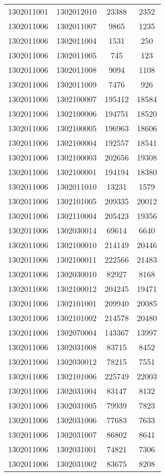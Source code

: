 \begin{longtable}[h]{llcc}
		1302011001 & 1302012010 & 23388 & 2352\\
		1302011006 & 1302011007 & 9865 & 1235\\
		1302011006 & 1302011004 & 1531 & 250\\
		1302011006 & 1302011005 & 745 & 123\\
		1302011006 & 1302011008 & 9094 & 1108\\
		1302011006 & 1302011009 & 7476 & 926\\
		1302011006 & 1302100007 & 195412 & 18584\\
		1302011006 & 1302100006 & 194751 & 18520\\
		1302011006 & 1302100005 & 196963 & 18606\\
		1302011006 & 1302100004 & 192557 & 18541\\
		1302011006 & 1302100003 & 202656 & 19308\\
		1302011006 & 1302100001 & 194194 & 18380\\
		1302011006 & 1302011010 & 13231 & 1579\\
		1302011006 & 1302101005 & 209335 & 20012\\
		1302011006 & 1302110004 & 205423 & 19356\\
		1302011006 & 1302030014 & 69614 & 6640\\
		1302011006 & 1302100010 & 214149 & 20446\\
		1302011006 & 1302100011 & 222566 & 21483\\
		1302011006 & 1302030010 & 82927 & 8168\\
		1302011006 & 1302100012 & 204245 & 19471\\
		1302011006 & 1302101001 & 209940 & 20085\\
		1302011006 & 1302101002 & 214578 & 20480\\
		1302011006 & 1302070004 & 143367 & 13997\\
		1302011006 & 1302031008 & 83715 & 8452\\
		1302011006 & 1302030012 & 78215 & 7551\\
		1302011006 & 1302101006 & 225749 & 22003\\
		1302011006 & 1302031004 & 83147 & 8132\\
		1302011006 & 1302031005 & 79939 & 7823\\
		1302011006 & 1302031006 & 77683 & 7633\\
		1302011006 & 1302031007 & 86802 & 8641\\
		1302011006 & 1302031001 & 74821 & 7306\\
		1302011006 & 1302031002 & 83675 & 8208\\

\end{longtable}
